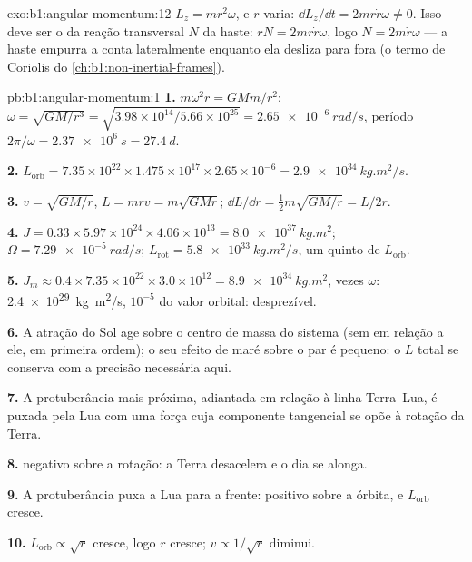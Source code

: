 \begin{solution}{exo:b1:angular-momentum:12}
$L_z = mr^2\omega$, e $r$ varia: $\dd L_z/\dd t = 2mr\dot r\omega \neq 0$.
Isso deve ser o  da reação transversal $N$ da haste: $rN =
2mr\dot r\omega$, logo $N = 2m\dot r\omega$ --- a haste empurra a conta lateralmente
enquanto ela desliza para fora (o termo de Coriolis do \cref{ch:b1:non-inertial-frames}).
\end{solution}

\begin{solution}{pb:b1:angular-momentum:1}
\textbf{1.} $m\omega^2r = GMm/r^2$: $\omega = \sqrt{GM/r^3} = \sqrt{3.98\times
10^{14}/5.66\times10^{25}} = \qty{2.65e-6}{rad/s}$, período $2\pi/\omega =
\qty{2.37e6}{s} = \qty{27.4}{d}$.

\textbf{2.} $L_{\text{orb}} = 7.35\times10^{22} \times 1.475\times10^{17}
\times 2.65\times10^{-6} = \qty{2.9e34}{kg.m^2/s}$.

\textbf{3.} $v = \sqrt{GM/r}$, $L = mrv = m\sqrt{GMr}$; $\dd L/\dd r =
\tfrac12 m\sqrt{GM/r} = L/2r$.

\textbf{4.} $J = 0.33 \times 5.97\times10^{24} \times 4.06\times10^{13} =
\qty{8.0e37}{kg.m^2}$; $\Omega = \qty{7.29e-5}{rad/s}$; $L_{\text{rot}} =
\qty{5.8e33}{kg.m^2/s}$, um quinto de $L_{\text{orb}}$.

\textbf{5.} $J_m \approx 0.4 \times 7.35\times10^{22} \times 3.0\times10^{12} =
\qty{8.9e34}{kg.m^2}$, vezes $\omega$: \qty{2.4e29}{kg.m^2/s}, $10^{-5}$ do
valor orbital: desprezível.

\textbf{6.} A atração do Sol age sobre o centro de massa do sistema
(sem  em relação a ele, em primeira ordem); o seu efeito de maré sobre o par é
pequeno: o $L$ total se conserva com a precisão necessária aqui.

\textbf{7.} A protuberância mais próxima, adiantada em relação à linha Terra--Lua, é puxada
pela Lua com uma força cuja componente tangencial se opõe à rotação
da Terra.

\textbf{8.}  negativo sobre a rotação: a Terra desacelera e o dia
se alonga.

\textbf{9.} A protuberância puxa a Lua para a frente:  positivo sobre a
órbita, e $L_{\text{orb}}$ cresce.

\textbf{10.} $L_{\text{orb}} \propto \sqrt r$ cresce, logo $r$ cresce; $v \propto
1/\sqrt r$ diminui.


\end{solution}
